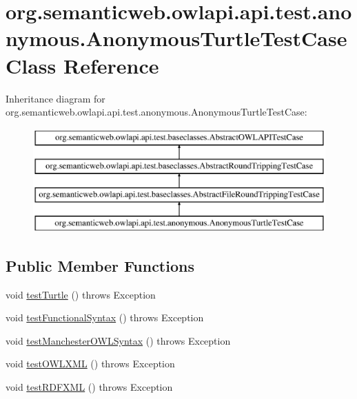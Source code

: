 \hypertarget{classorg_1_1semanticweb_1_1owlapi_1_1api_1_1test_1_1anonymous_1_1_anonymous_turtle_test_case}{\section{org.\-semanticweb.\-owlapi.\-api.\-test.\-anonymous.\-Anonymous\-Turtle\-Test\-Case Class Reference}
\label{classorg_1_1semanticweb_1_1owlapi_1_1api_1_1test_1_1anonymous_1_1_anonymous_turtle_test_case}
}
Inheritance diagram for org.\-semanticweb.\-owlapi.\-api.\-test.\-anonymous.\-Anonymous\-Turtle\-Test\-Case\-:\begin{figure}[H]
\begin{center}
\leavevmode
\includegraphics[height=4.000000cm]{classorg_1_1semanticweb_1_1owlapi_1_1api_1_1test_1_1anonymous_1_1_anonymous_turtle_test_case}
\end{center}
\end{figure}
\subsection*{Public Member Functions}
\begin{DoxyCompactItemize}
\item 
void \hyperlink{classorg_1_1semanticweb_1_1owlapi_1_1api_1_1test_1_1anonymous_1_1_anonymous_turtle_test_case_abd230e1146d12f69c9f7e820600dfb09}{test\-Turtle} ()  throws Exception 
\item 
void \hyperlink{classorg_1_1semanticweb_1_1owlapi_1_1api_1_1test_1_1anonymous_1_1_anonymous_turtle_test_case_a8b381300a52d1229f895a27b11404de1}{test\-Functional\-Syntax} ()  throws Exception 
\item 
void \hyperlink{classorg_1_1semanticweb_1_1owlapi_1_1api_1_1test_1_1anonymous_1_1_anonymous_turtle_test_case_af971f8bf29b4ea8845683fb9a0572e28}{test\-Manchester\-O\-W\-L\-Syntax} ()  throws Exception 
\item 
void \hyperlink{classorg_1_1semanticweb_1_1owlapi_1_1api_1_1test_1_1anonymous_1_1_anonymous_turtle_test_case_a2ddb0a58806dab3c6c225a53e351821c}{test\-O\-W\-L\-X\-M\-L} ()  throws Exception 
\item 
void \hyperlink{classorg_1_1semanticweb_1_1owlapi_1_1api_1_1test_1_1anonymous_1_1_anonymous_turtle_test_case_a91c438e7273d27849dcf2c13b9750a6d}{test\-R\-D\-F\-X\-M\-L} ()  throws Exception 
\end{DoxyCompactItemize}
